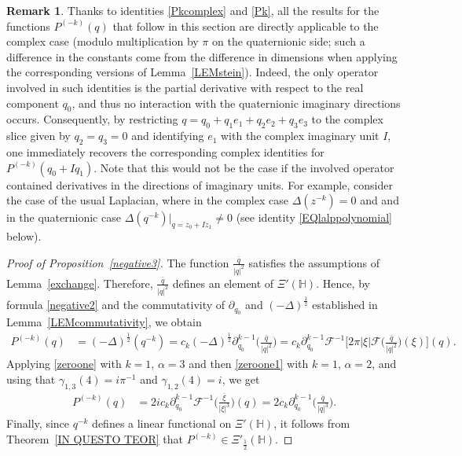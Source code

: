 \documentclass[reqno,11pt]{amsart}
\theoremstyle{definition}
\newtheorem{remark}[theorem]{Remark}
\begin{document}
\begin{remark}
	\label{REMquaternioncomplex}
	Thanks to identities \eqref{Pkcomplex} and \eqref{Pk}, all the results for the functions $P^{(-k)}(q)$ that follow in this section are directly applicable to the complex case (modulo multiplication by $\pi$ on the quaternionic side; such a difference in the constants come from the difference in dimensions when applying the corresponding versions of Lemma~\ref{LEMstein}). Indeed, the only operator involved in such identities is the partial derivative with respect to the real component $q_0$, and thus no interaction with the quaternionic imaginary directions occurs. Consequently, by restricting $q=q_0+q_1e_1+q_2e_2+q_3e_3$ to the complex slice given by $q_2=q_3=0$ and identifying $e_1$ with the complex imaginary unit $I$, one immediately recovers the corresponding complex identities for $P^{(-k)}(q_0+Iq_1)$. Note that this would not be the case if the involved operator contained derivatives in the directions of imaginary units. For example, consider the case of the usual Laplacian, where in the complex case $\Delta(z^{-k})=0$ and and in the quaternionic case $\Delta(q^{-k})\big|_{q=z_0+Iz_1}\neq 0$ (see identity \eqref{EQlalppolynomial} below).
\end{remark}

\begin{proof}[Proof of Proposition~\ref{negative3}]
The function $\frac{\overline{q}}{|q|^2}$ satisfies the assumptions of Lemma~\ref{exchange}. Therefore, $\frac{\overline{q}}{|q|^2}$ defines an element of $\Xi'(\mathbb{H})$. Hence, by formula \eqref{negative2} and the commutativity of $\partial_{q_0}$ and $(-\Delta)^{\frac{1}{2}}$ established in Lemma~\ref{LEMcommutativity}, we obtain
	\begin{align*}
		P^{(-k)}(q)&= (-\Delta)^{ \frac{1}{2}}(q^{-k})= c_k (-\Delta)^{ \frac{1}{2}} \partial_{q_0}^{k-1} \bigg(\frac{\bar{q}}{|q|^2} \bigg)= c_k \partial_{q_0}^{k-1} \mathcal{F}^{-1} \bigg[ 2\pi |\xi| \mathcal{F} \bigg( \frac{\bar{q}}{|q|^2}\bigg)(\xi) \bigg] (q).
	\end{align*}
	Applying \eqref{zeroone} with $k=1$, $\alpha=3$ and then \eqref{zeroone1} with $k=1$, $\alpha=2$, and using that $\gamma_{1,3}(4)=i \pi^{-1}$ and $\gamma_{1,2}(4)= i$, we get
	\begin{align*}
		P^{(-k)}(q)&= 2 i  c_k \partial_{q_0}^{k-1}\mathcal{F}^{-1} \bigg( \frac{\bar{\xi}}{|\xi|^{3}}\bigg)(q)=  2  c_k \partial_{q_0}^{k-1}\bigg( \frac{\bar{q}}{|q|^{3}}\bigg).
	\end{align*}
Finally, since $q^{-k}$ defines a linear functional on $\Xi'(\mathbb{H})$, it follows from Theorem~\ref{IN QUESTO TEOR} that $P^{(-k)} \in \Xi'_{\frac{1}{2}}(\mathbb{H})$.
\end{proof}
\end{document}
